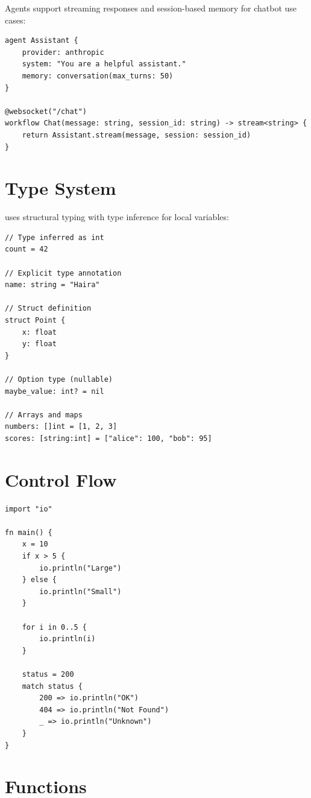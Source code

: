 Agents support streaming responses and session-based memory for chatbot use cases:

\begin{lstlisting}
agent Assistant {
    provider: anthropic
    system: "You are a helpful assistant."
    memory: conversation(max_turns: 50)
}

@websocket("/chat")
workflow Chat(message: string, session_id: string) -> stream<string> {
    return Assistant.stream(message, session: session_id)
}
\end{lstlisting}

\section{Type System}

\haira{} uses structural typing with type inference for local variables:

\begin{lstlisting}
// Type inferred as int
count = 42

// Explicit type annotation
name: string = "Haira"

// Struct definition
struct Point {
    x: float
    y: float
}

// Option type (nullable)
maybe_value: int? = nil

// Arrays and maps
numbers: []int = [1, 2, 3]
scores: [string:int] = ["alice": 100, "bob": 95]
\end{lstlisting}

\section{Control Flow}

\begin{lstlisting}
import "io"

fn main() {
    x = 10
    if x > 5 {
        io.println("Large")
    } else {
        io.println("Small")
    }

    for i in 0..5 {
        io.println(i)
    }

    status = 200
    match status {
        200 => io.println("OK")
        404 => io.println("Not Found")
        _ => io.println("Unknown")
    }
}
\end{lstlisting}

\section{Functions}


